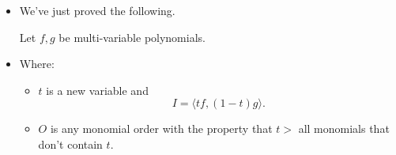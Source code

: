 \begin{frame}
\begin{itemize}
\item We've just proved the following.
\begin{theorem}
Let $f,g$ be multi-variable polynomials.	
	
\end{theorem}
\item Where: 
\begin{itemize}
\item $t$ is a new variable and
\[
I=\langle t f, (1-t)g \rangle.
\]
\item $O$ is any monomial order with the property that $t>$ all monomials that don't contain $t$.
\end{itemize}
\end{itemize}
\end{frame}